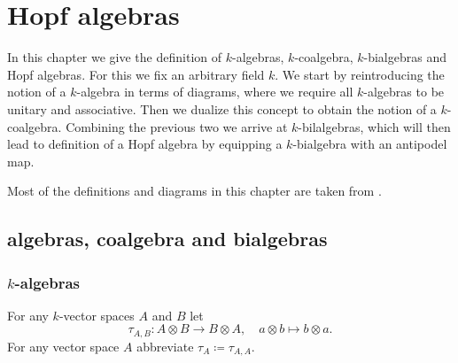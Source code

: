 \chapter{Hopf algebras}
In this chapter we give the definition of $k$-algebras, $k$-coalgebra, $k$-bialgebras and Hopf algebras. For this we fix an arbitrary field $k$. We start by reintroducing the notion of a $k$-algebra in terms of diagrams, where we require all $k$-algebras to be unitary and associative. Then we dualize this concept to obtain the notion of a $k$-coalgebra. Combining the previous two we arrive at $k$-bilalgebras, which will then lead to definition of a Hopf algebra by equipping a $k$-bialgebra with an antipodel map.

Most of the definitions and diagrams in this chapter are taken from \cite{Brown}.





\section{algebras, coalgebra and bialgebras}



\subsection{\texorpdfstring{$k$}{k}-algebras}


\begin{definition}
 For any $k$-vector spaces $A$ and $B$ let
 \[
  \tau_{A,B} \colon A \otimes B \to B \otimes A, \quad a \otimes b \mapsto b \otimes a.
 \]
 For any vector space $A$ abbreviate $\tau_A \coloneqq \tau_{A,A}$.
\end{definition}


